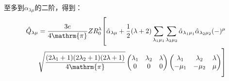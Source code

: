 至多到$\alpha_{\lambda\mu}$的二阶，得到：
\begin{align*}
\hat{Q}_{\lambda\mu} & =\frac{3e}{4\mathrm{\pi}}ZR^{\lambda}_{0}\Bigggl[\hat{\alpha}_{\lambda\mu}+\frac{1}{2}(\lambda+2)\sum_{\lambda_{1}\mu_{1}}\sum_{\lambda_{2}\mu_{2}}\hat{\alpha}_{\lambda_{1}\mu_{1}}\hat{\alpha}_{\lambda_{2}\mu_{2}}(-)^{\mu}\\
 & \sqrt{\frac{(2\lambda_{1}+1)(2\lambda_{2}+1)(2\lambda+1)}{4\mathrm{\pi}}}\begin{pmatrix}\lambda_{1} & \lambda_{2} & \lambda\\
0 & 0 & 0
\end{pmatrix}\begin{pmatrix}\lambda_{1} & \lambda_{2} & \lambda\\
-\mu_{1} & -\mu_{2} & \mu
\end{pmatrix}\Bigggr]
\end{align*}

